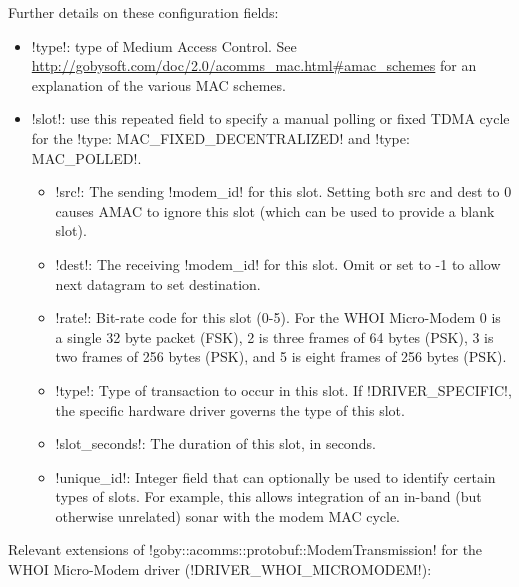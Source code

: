 \resetbvlinenumber


Further details on these configuration fields: 
\begin{itemize}
\item !type!: type of Medium Access Control. See \url{http://gobysoft.com/doc/2.0/acomms_mac.html#amac_schemes} for an explanation of the various MAC schemes.
\item !slot!: use this repeated field to specify a manual polling or fixed TDMA cycle for the  !type: MAC_FIXED_DECENTRALIZED! and  !type: MAC_POLLED!. 
\begin{itemize}
\item !src!: The sending !modem_id! for this slot. Setting both src and dest to 0 causes AMAC to ignore this slot (which can be used to provide a blank slot).
\item !dest!: The receiving !modem_id! for this slot. Omit or set to -1 to allow next datagram to set destination.
\item !rate!: Bit-rate code for this slot (0-5). For the WHOI Micro-Modem 0 is a single 32 byte packet (FSK), 2 is three frames of 64 bytes (PSK), 3 is two frames of 256 bytes (PSK), and 5 is eight frames of 256 bytes (PSK).
\item !type!: Type of transaction to occur in this slot. If !DRIVER_SPECIFIC!, the specific hardware driver governs the type of this slot.
\item !slot_seconds!: The duration of this slot, in seconds.
\item !unique_id!: Integer field that can optionally be used to identify certain types of slots. For example, this allows integration of an in-band (but otherwise unrelated) sonar with the modem MAC cycle.
\end{itemize} 
\end{itemize} 


Relevant extensions of !goby::acomms::protobuf::ModemTransmission! for the WHOI Micro-Modem driver (!DRIVER_WHOI_MICROMODEM!):

\resetbvlinenumber

